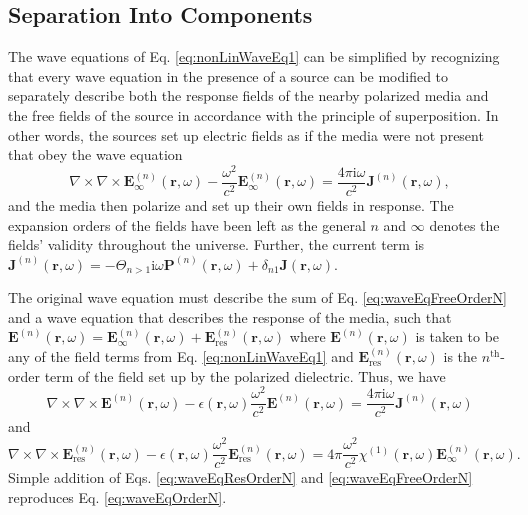 \documentclass{article}
\begin{document}
\subsection{Separation Into Components}\label{sec:fieldSep}

The wave equations of Eq. \eqref{eq:nonLinWaveEq1} can be simplified by recognizing that every wave equation in the presence of a source can be modified to separately describe both the response fields of the nearby polarized media and the free fields of the source in accordance with the principle of superposition. In other words, the sources set up electric fields as if the media were not present that obey the wave equation
\begin{equation}\label{eq:waveEqFreeOrderN}
\nabla\times\nabla\times\mathbf{E}_\infty^{(n)}(\mathbf{r},\omega) - \frac{\omega^2}{c^2}\mathbf{E}_\infty^{(n)}(\mathbf{r},\omega) = \frac{4\pi\mathrm{i}\omega}{c^2}\mathbf{J}^{(n)}(\mathbf{r},\omega),
\end{equation}
and the media then polarize and set up their own fields in response. The expansion orders of the fields have been left as the general $n$ and $\infty$ denotes the fields' validity throughout the universe. Further, the current term is $\mathbf{J}^{(n)}(\mathbf{r},\omega) = -\Theta_{n>1}\mathrm{i}\omega\mathbf{P}^{(n)}(\mathbf{r},\omega) + \delta_{n1}\mathbf{J}(\mathbf{r},\omega)$.

The original wave equation must describe the sum of Eq. \eqref{eq:waveEqFreeOrderN} and a wave equation that describes the response of the media, such that $\mathbf{E}^{(n)}(\mathbf{r},\omega) = \mathbf{E}_\infty^{(n)}(\mathbf{r},\omega) + \mathbf{E}_\mathrm{res}^{(n)}(\mathbf{r},\omega)$ where $\mathbf{E}^{(n)}(\mathbf{r},\omega)$ is taken to be any of the field terms from Eq. \eqref{eq:nonLinWaveEq1} and $\mathbf{E}^{(n)}_\mathrm{res}(\mathbf{r},\omega)$ is the $n^\mathrm{th}$-order term of the field set up by the polarized dielectric. Thus, we have
\begin{equation}\label{eq:waveEqOrderN}
\nabla\times\nabla\times\mathbf{E}^{(n)}(\mathbf{r},\omega) - \epsilon(\mathbf{r},\omega)\frac{\omega^2}{c^2}\mathbf{E}^{(n)}(\mathbf{r},\omega) = \frac{4\pi\mathrm{i}\omega}{c^2}\mathbf{J}^{(n)}(\mathbf{r},\omega)
\end{equation}
and
\begin{equation}\label{eq:waveEqResOrderN}
\nabla\times\nabla\times\mathbf{E}^{(n)}_\mathrm{res}(\mathbf{r},\omega) - \epsilon(\mathbf{r},\omega)\frac{\omega^2}{c^2}\mathbf{E}^{(n)}_\mathrm{res}(\mathbf{r},\omega) = 4\pi\frac{\omega^2}{c^2}\chi^{(1)}(\mathbf{r},\omega)\mathbf{E}^{(n)}_\infty(\mathbf{r},\omega).
\end{equation}
Simple addition of Eqs. \eqref{eq:waveEqResOrderN} and \eqref{eq:waveEqFreeOrderN} reproduces Eq. \eqref{eq:waveEqOrderN}.
\end{document}
